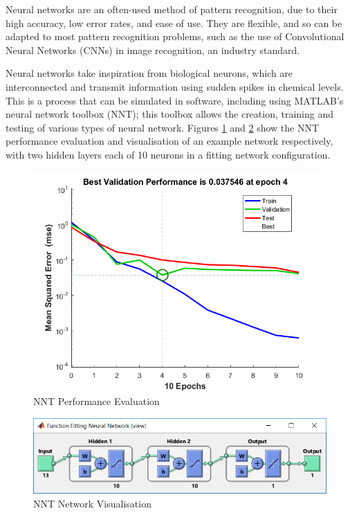 \documentclass[a4paper, 10pt, conference]{ieeeconf}
\begin{document}

Neural networks are an often-used method of pattern recognition, due to their high accuracy, low error rates, and ease of use. They are flexible, and so can be adapted to most pattern recognition problems, such as the use of Convolutional Neural Networks (CNNs) in image recognition, an industry standard.

Neural networks take inspiration from biological neurons, which are interconnected and transmit information using sudden spikes in chemical levels. This is a process that can be simulated in software, including using MATLAB's neural network toolbox (NNT); this toolbox allows the creation, training and testing of various types of neural network. Figures \ref{fig:nnt_perf} and \ref{fig:nnt_vis} show the NNT performance evaluation and visualisation of an example network respectively, with two hidden layers each of 10 neurons in a fitting network configuration.

\begin{figure}[!ht]
    \centering
    \includegraphics[width=\linewidth]{pic/performance}
    \caption{NNT Performance Evaluation}
    \label{fig:nnt_perf}
\end{figure}

\begin{figure}[!ht]
    \centering
    \includegraphics[width=\linewidth]{pic/view_twolayer}
    \caption{NNT Network Visualisation}
    \label{fig:nnt_vis}
\end{figure}
\end{document}

